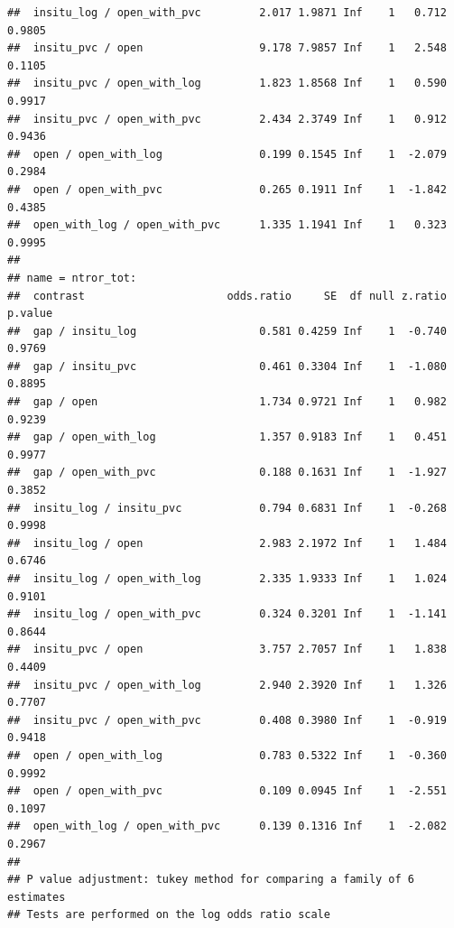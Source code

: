 \documentclass[
]{article}
\begin{document}
\begin{verbatim}
##  insitu_log / open_with_pvc         2.017 1.9871 Inf    1   0.712  0.9805
##  insitu_pvc / open                  9.178 7.9857 Inf    1   2.548  0.1105
##  insitu_pvc / open_with_log         1.823 1.8568 Inf    1   0.590  0.9917
##  insitu_pvc / open_with_pvc         2.434 2.3749 Inf    1   0.912  0.9436
##  open / open_with_log               0.199 0.1545 Inf    1  -2.079  0.2984
##  open / open_with_pvc               0.265 0.1911 Inf    1  -1.842  0.4385
##  open_with_log / open_with_pvc      1.335 1.1941 Inf    1   0.323  0.9995
## 
## name = ntror_tot:
##  contrast                      odds.ratio     SE  df null z.ratio p.value
##  gap / insitu_log                   0.581 0.4259 Inf    1  -0.740  0.9769
##  gap / insitu_pvc                   0.461 0.3304 Inf    1  -1.080  0.8895
##  gap / open                         1.734 0.9721 Inf    1   0.982  0.9239
##  gap / open_with_log                1.357 0.9183 Inf    1   0.451  0.9977
##  gap / open_with_pvc                0.188 0.1631 Inf    1  -1.927  0.3852
##  insitu_log / insitu_pvc            0.794 0.6831 Inf    1  -0.268  0.9998
##  insitu_log / open                  2.983 2.1972 Inf    1   1.484  0.6746
##  insitu_log / open_with_log         2.335 1.9333 Inf    1   1.024  0.9101
##  insitu_log / open_with_pvc         0.324 0.3201 Inf    1  -1.141  0.8644
##  insitu_pvc / open                  3.757 2.7057 Inf    1   1.838  0.4409
##  insitu_pvc / open_with_log         2.940 2.3920 Inf    1   1.326  0.7707
##  insitu_pvc / open_with_pvc         0.408 0.3980 Inf    1  -0.919  0.9418
##  open / open_with_log               0.783 0.5322 Inf    1  -0.360  0.9992
##  open / open_with_pvc               0.109 0.0945 Inf    1  -2.551  0.1097
##  open_with_log / open_with_pvc      0.139 0.1316 Inf    1  -2.082  0.2967
## 
## P value adjustment: tukey method for comparing a family of 6 estimates 
## Tests are performed on the log odds ratio scale
\end{verbatim}
\end{document}
